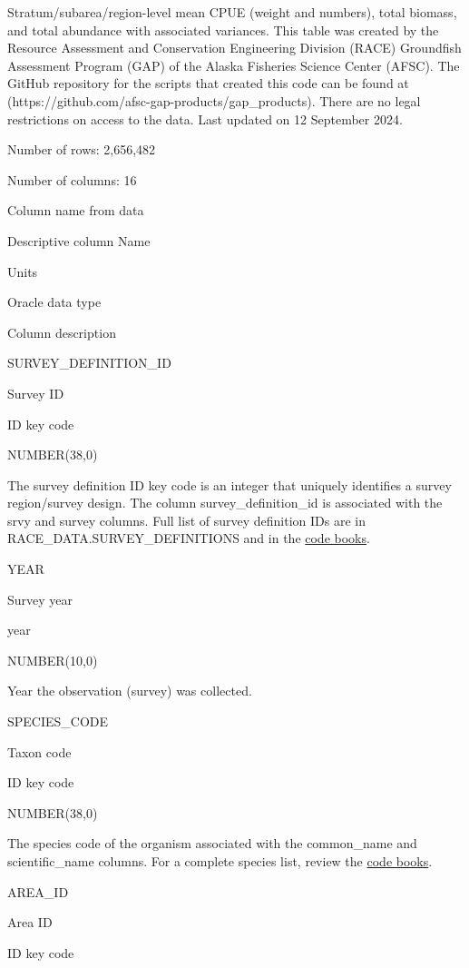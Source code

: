 \documentclass[
  letterpaper,
  oneside,
  open=any]{scrbook}
\begin{document}
Stratum/subarea/region-level mean CPUE (weight and numbers), total
biomass, and total abundance with associated variances. This table was
created by the Resource Assessment and Conservation Engineering Division
(RACE) Groundfish Assessment Program (GAP) of the Alaska Fisheries
Science Center (AFSC). The GitHub repository for the scripts that
created this code can be found at
(https://github.com/afsc-gap-products/gap\_products). There are no legal
restrictions on access to the data. Last updated on 12 September 2024.

Number of rows: 2,656,482

Number of columns: 16

Column name from data

Descriptive column Name

Units

Oracle data type

Column description

SURVEY\_DEFINITION\_ID

Survey ID

ID key code

NUMBER(38,0)

The survey definition ID key code is an integer that uniquely identifies
a survey region/survey design. The column survey\_definition\_id is
associated with the srvy and survey columns. Full list of survey
definition IDs are in RACE\_DATA.SURVEY\_DEFINITIONS and in the
\href{https://www.fisheries.noaa.gov/resource/document/groundfish-survey-species-code-manual-and-data-codes-manual}{code
books}.

YEAR

Survey year

year

NUMBER(10,0)

Year the observation (survey) was collected.

SPECIES\_CODE

Taxon code

ID key code

NUMBER(38,0)

The species code of the organism associated with the common\_name and
scientific\_name columns. For a complete species list, review the
\href{https://www.fisheries.noaa.gov/resource/document/groundfish-survey-species-code-manual-and-data-codes-manual}{code
books}.

AREA\_ID

Area ID

ID key code
\end{document}
